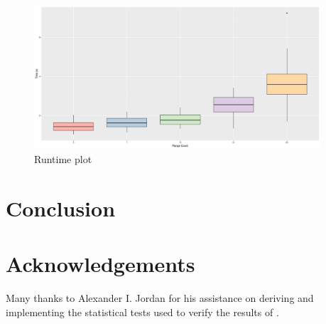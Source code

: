\documentclass{article}
\begin{document}
\begin{figure}
  \begin{center}
    \includegraphics[width=0.95\textwidth]{figs/bigrig-runtime-range-time-boxplot.png}
  \end{center}
  \caption{Runtime plot}\label{fig:runtime-regions}
\end{figure}


\section{Conclusion}

\section{Acknowledgements}

Many thanks to Alexander I. Jordan for his assistance on deriving and
implementing the statistical tests used to verify the results of \bigrig{}.


\end{document}
